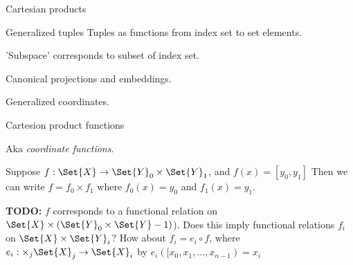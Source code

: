 \begin{plSection}{Cartesian products}
\begin{plSection}{Generalized tuples}
Tuples as functions from index set to set elements.

'Subspace' corresponds to subset of index set.

Canonical projections and embeddings.

Generalized coordinates.
\end{plSection}%
\begin{plSection}{Cartesion product functions}
\label{sec:Cartesion-product-functions}

Aka \textit{coordinate functions}.

Suppose $f : \Set{X} \rightarrow \Set{Y}_0 \times \Set{Y}_1$,
and $f \left( x \right) = \left[ y_0 ,y_1 \right]$
Then we can write $f = f_0 \times f_1$ where
$f_0 \left( x \right) = y_0 $
and
$f_1 \left( x \right) = y_1 $.

\textbf{TODO:} $f$ corresponds to a functional relation on 
$\Set{X} \times \left( \Set{Y}_0 \times \Set{Y}-1 \right)$).
Does this imply functional relations $f_i$ on
$\Set{X} \times \Set{Y}_i$?
How about $f_i = e_i \circ f$,
where $e_i : \times_j \Set{X}_j  \rightarrow \Set{X}_i$ by
$e_i \left( [x_0, x_1, \ldots , x_{n-1} \right) = x_i$ 

\end{plSection}%
\end{plSection}%

